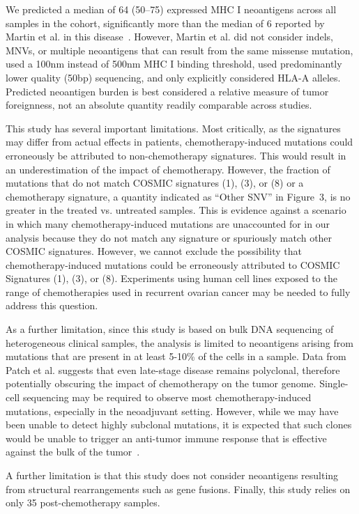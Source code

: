 \documentclass[linenumbers]{bmcart}
\begin{document}
We predicted a median of 64 (50--75) expressed MHC I neoantigens across all samples in the cohort, significantly more than the median of 6 reported by Martin et al. in this disease~\cite{Martin_2016}. However, Martin et al. did not consider indels, MNVs, or multiple neoantigens that can result from the same missense mutation, used a 100nm instead of 500nm MHC I binding threshold, used predominantly lower quality (50bp) sequencing, and only explicitly considered HLA-A alleles. Predicted neoantigen burden is best considered a relative measure of tumor foreignness, not an absolute quantity readily comparable across studies.

This study has several important limitations. Most critically, as the signatures may differ from actual effects in patients, chemotherapy-induced mutations could erroneously be attributed to non-chemotherapy signatures. This would result in an underestimation of the impact of chemotherapy. However, the fraction of mutations that do not match COSMIC signatures (1), (3), or (8) or a chemotherapy signature, a quantity indicated as ``Other SNV'' in Figure~3, is no greater in the treated vs. untreated samples. This is evidence against a scenario in which many chemotherapy-induced mutations are unaccounted for in our analysis because they do not match any signature or spuriously match other COSMIC signatures. However, we cannot exclude the possibility that chemotherapy-induced mutations could be erroneously attributed to COSMIC Signatures (1), (3), or (8). Experiments using human cell lines exposed to the range of chemotherapies used in recurrent ovarian cancer may be needed to fully address this question.

As a further limitation, since this study is based on bulk DNA sequencing of heterogeneous clinical samples, the analysis is limited to neoantigens arising from mutations that are present in at least 5-10\% of the cells in a sample. Data from Patch et al. suggests that even late-stage disease remains polyclonal, therefore potentially obscuring the impact of chemotherapy on the tumor genome. Single-cell sequencing may be required to observe most chemotherapy-induced mutations, especially in the neoadjuvant setting. However, while we may have been unable to detect highly subclonal mutations, it is expected that such clones would be unable to trigger an anti-tumor immune response that is effective against the bulk of the tumor~\cite{McGranahan_2016}. 

A further limitation is that this study does not consider neoantigens resulting from structural rearrangements such as gene fusions. Finally, this study relies on only 35 post-chemotherapy samples.
\end{document}
